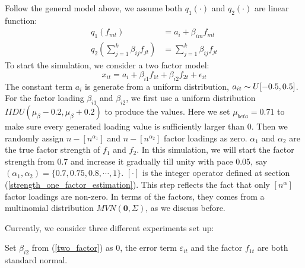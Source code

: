 Follow the general model above, we assume both $q_1(\cdot)$ and $q_2(\cdot)$ are linear function:
\begin{align*}
q_1({f_{mt}}) &= a_{i} +\beta_{im} f_{mt}\\
q_2(\sum_{j = 1}^{k}\beta_{ij}f_{jt}) &=\sum_{j = 1}^{k}\beta_{ij}f_{jt}
\end{align*}
To start the simulation, we consider a two factor model:
\[    x_{it} = a_{i} + \beta_{i1}f_{1t} + \beta_{i2}f_{2t}+\epsilon_{it} \tag{7} \label{two_factor}   \]
The constant term $a_{i}$ is generate from a uniform distribution, $a_{it} \sim \mathnormal{U}[-0.5,0.5]$.
For the factor loading $\beta_{i1}$ and $\beta_{i2}$, we first use a uniform distribution $IIDU(\mu_{\beta} - 0.2, \mu_{\beta}+0.2)$ to produce the values.
Here we set $\mu_{beta}=0.71$ to make sure every generated loading value is sufficiently larger than 0.
Then we randomly assign $n - [n^{\alpha_{1}}]$ and $n - [n^{\alpha_{2}}]$ factor loadings as zero.
$\alpha_1$ and $\alpha_2$ are the true factor strength of $f_1$ and $f_2$. 
In this simulation, we will start the factor strength from 0.7 and increase it gradually till unity with pace 0.05, say $(\alpha_{1}, \alpha_{2}) = \{0.7, 0.75,0.8,\cdots,1\}$.
 $[\cdot]$ is the integer operator defined at section (\ref{strength_one_factor_estimation}).
This step reflects the fact that only $[n^\alpha]$ factor loadings are non-zero.
In terms of the factors, they comes from a multinomial distribution $MVN(\mathbf{0}, \Sigma) $, as we discuss before.

Currently, we consider three different experiments set up:

\begin{experiment}
Set $\beta_{i2}$ from (\ref{two_factor}) as 0, the error term $\varepsilon_{it}$ and the factor $f_{1t}$ are both standard normal.
\end{experiment}

